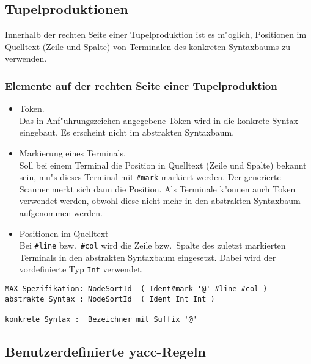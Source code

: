 
\subsection{Tupelproduktionen}

Innerhalb der rechten Seite einer Tupelproduktion ist es m"oglich,
Positionen im Quelltext (Zeile und Spalte) von Terminalen des
konkreten Syntaxbaums zu verwenden.

\subsubsection*{Elemente auf der rechten Seite einer Tupelproduktion}

\begin{itemize}
\item Token.\\
Das in Anf"uhrungszeichen angegebene Token wird in die konkrete Syntax
eingebaut. Es erscheint nicht im abstrakten Syntaxbaum.

\item Markierung eines Terminals.\\
Soll bei einem Terminal die Position in Quelltext (Zeile und Spalte)
bekannt sein, mu"s dieses Terminal mit {\tt \#mark} markiert werden.
Der generierte Scanner merkt sich dann die Position.
Als Terminale k"onnen auch Token verwendet werden, obwohl diese nicht mehr
in den abstrakten Syntaxbaum aufgenommen werden.

\item Positionen im Quelltext\\
Bei {\tt \#line} bzw.\ {\tt \#col} wird die Zeile bzw.\ Spalte
des zuletzt markierten Terminals in den abstrakten Syntaxbaum eingesetzt.
Dabei wird der vordefinierte Typ {\tt Int} verwendet.
\end{itemize}

\begin{verbatim}
MAX-Spezifikation: NodeSortId  ( Ident#mark '@' #line #col )
abstrakte Syntax : NodeSortId  ( Ident Int Int )

konkrete Syntax :  Bezeichner mit Suffix '@'
\end{verbatim}



\subsection{Benutzerdefinierte yacc-Regeln}

